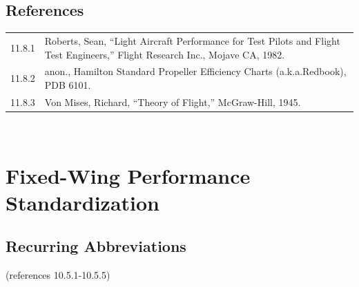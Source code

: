 \documentclass[
]{book}
\begin{document}
\hypertarget{references-9}{%
\section{References}\label{references-9}}

\begin{longtable}[]{@{}ll@{}}
\toprule
\endhead
\begin{minipage}[t]{0.10\columnwidth}\raggedright
11.8.1\strut
\end{minipage} & \begin{minipage}[t]{0.84\columnwidth}\raggedright
Roberts, Sean, ``Light Aircraft Performance for Test Pilots and Flight Test Engineers,'' Flight Research Inc., Mojave CA, 1982.\strut
\end{minipage}\tabularnewline
\begin{minipage}[t]{0.10\columnwidth}\raggedright
11.8.2\strut
\end{minipage} & \begin{minipage}[t]{0.84\columnwidth}\raggedright
anon., Hamilton Standard Propeller Efficiency Charts (a.k.a.Redbook), PDB 6101.\strut
\end{minipage}\tabularnewline
\begin{minipage}[t]{0.10\columnwidth}\raggedright
11.8.3\strut
\end{minipage} & \begin{minipage}[t]{0.84\columnwidth}\raggedright
Von Mises, Richard, ``Theory of Flight,'' McGraw-Hill, 1945.\strut
\end{minipage}\tabularnewline
\bottomrule
\end{longtable}

~

\hypertarget{fixed-wing-performance-standardization}{%
\chapter{Fixed-Wing Performance Standardization}\label{fixed-wing-performance-standardization}}

\hypertarget{recurring-abbreviations-1}{%
\section{Recurring Abbreviations}\label{recurring-abbreviations-1}}

(references 10.5.1-10.5.5)
\end{document}
